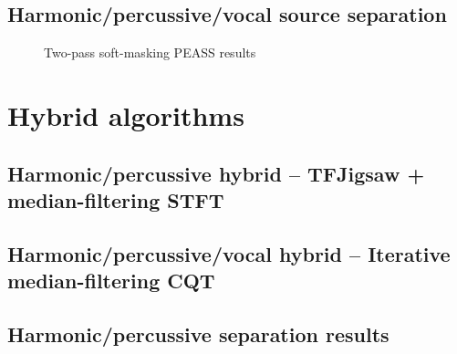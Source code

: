 \documentclass[letter,12pt]{article}
\begin{document}
\vfill
\clearpage %

\subsection{Harmonic/percussive/vocal source separation}

\begin{figure}[ht]
	\centering
	\vspace{-1.25em}
	\caption{Two-pass soft-masking PEASS results}
	\label{fig:vocalround1soft}
\end{figure}

\vfill
\clearpage %

\section{Hybrid algorithms}
\label{sec:hybrids}

\subsection{Harmonic/percussive hybrid -- TFJigsaw + median-filtering STFT}

\subsection{Harmonic/percussive/vocal hybrid -- Iterative median-filtering CQT}

\subsection{Harmonic/percussive separation results}
\end{document}
